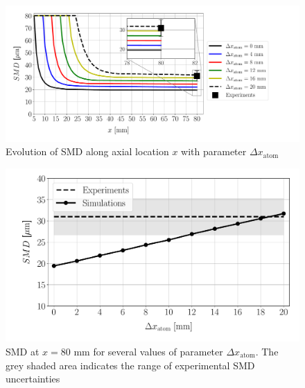 \begin{figure}[h!]
\centering
\includegraphics[scale=0.5]{./part2_developments/figures_ch6_lagrangian_JICF/params_dx_atom/SMD_vs_x_dx_atom_comparison}
\vspace*{-0.4in}
\caption{Evolution of SMD along axial location $x$ with parameter $\Delta x_\mathrm{atom}$}
\label{fig:SMD_vs_x_param_dx_atom}
\end{figure}

\begin{figure}[h!]
\centering
\includegraphics[scale=0.5]{./part2_developments/figures_ch6_lagrangian_JICF/params_dx_atom/SMD_vs_dx_atom}
\vspace*{-0.2in}
\caption[SMD at $x = 80$ mm for several values of parameter $\Delta x_\mathrm{atom}$]{SMD at $x = 80$ mm for several values of parameter $\Delta x_\mathrm{atom}$. The grey shaded area indicates the range of experimental SMD uncertainties  }
\label{fig:SMD_vs_dx_atom}
\end{figure}

\clearpage

